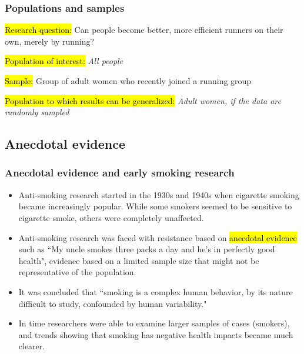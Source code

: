 \documentclass[slidestop,compress,mathserif]{beamer}
\makeatletter
\newcommand{\soln}[1]{\textit{#1}}
\def\chp1@path{../../Chp 1}
\makeatother
\begin{document}
\begin{frame}
	\frametitle{Populations and samples}

	{
	\hl{Research question:} Can people become better, more efficient runners on their own, merely by running? \\

	\pause 

	\hl{Population of interest:} \soln{\pause All people}
	}
	\pause 
	$\:$ \\
	\hl{Sample:} Group of adult women who recently joined a running group

	\pause

	\hl{Population to which results can be generalized:} \soln{\pause Adult women, if the data are randomly sampled}

\end{frame}


\subsection{Anecdotal evidence}


\begin{frame}
	\frametitle{Anecdotal evidence and early smoking research}

	\begin{itemize}

	\item Anti-smoking research started in the 1930s and 1940s when cigarette smoking became increasingly popular. While some smokers seemed to be sensitive to cigarette smoke, others were completely unaffected.

	\item Anti-smoking research was faced with resistance based on \hl{anecdotal evidence} such as ``My uncle smokes three packs a day and he's in perfectly good health", evidence based on a limited sample size that might not be representative of the population.

	\item It was concluded that ``smoking is a complex human behavior, by its nature difficult to study, confounded by human variability."

	\item In time researchers were able to examine larger samples of cases (smokers), and trends showing that smoking has negative health impacts became much clearer.

	\end{itemize}


\end{frame}
\end{document}
